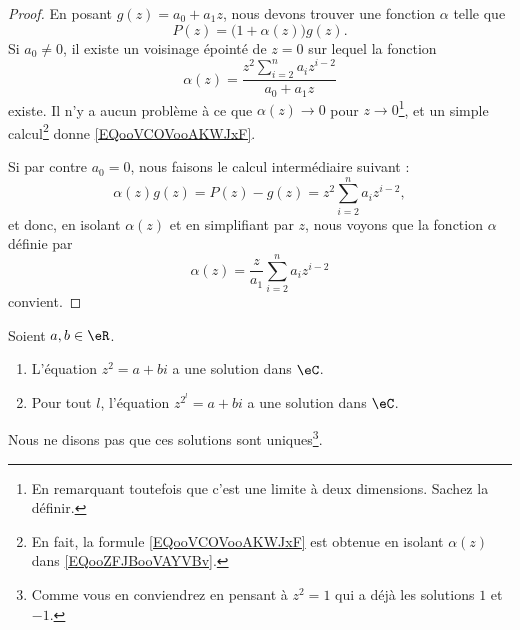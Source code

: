 \begin{proof}
	En posant \( g(z)=a_0+a_1z\), nous devons trouver une fonction \( \alpha\) telle que
	\begin{equation}        \label{EQooZFJBooVAYVBv}
		P(z)=\big( 1+\alpha(z) \big)g(z).
	\end{equation}
	Si \( a_0\neq 0\), il existe un voisinage épointé de \( z=0\) sur lequel la fonction
	\begin{equation}        \label{EQooVCOVooAKWJxF}
		\alpha(z)=\frac{ z^2\sum_{i=2}^na_iz^{i-2} }{ a_0+a_1z }
	\end{equation}
	existe. Il n'y a aucun problème à ce que \( \alpha(z)\to 0\) pour \( z\to 0\)\footnote{En remarquant toutefois que c'est une limite à deux dimensions. Sachez la définir.}, et un simple calcul\footnote{En fait, la formule \eqref{EQooVCOVooAKWJxF} est obtenue en isolant \( \alpha(z)\) dans \eqref{EQooZFJBooVAYVBv}.} donne \eqref{EQooVCOVooAKWJxF}.

	Si par contre \( a_0=0\), nous faisons le calcul intermédiaire suivant :
	\begin{equation}
		\alpha(z)g(z)=P(z)-g(z)=z^2\sum_{i=2}^na_iz^{i-2},
	\end{equation}
	et donc, en isolant \( \alpha(z)\) et en simplifiant par \( z\), nous voyons que la fonction \( \alpha\) définie par
	\begin{equation}
		\alpha(z)=\frac{z}{ a_1 }\sum_{i=2}^na_iz^{i-2}
	\end{equation}
	convient.
\end{proof}

\begin{proposition}       \label{PROPooLBBLooQwEiHr}
	Soient \( a,b\in \eR\).
	\begin{enumerate}
		\item       \label{ITEMooSPSWooKLtqzZ}
		      L'équation \( z^2=a+bi\) a une solution dans \( \eC\).
		\item       \label{ITEMooQOJDooWjfGXv}
		      Pour tout \( l\), l'équation \( z^{2^l}=a+bi\) a une solution dans \( \eC\).
	\end{enumerate}
	Nous ne disons pas que ces solutions sont uniques\footnote{Comme vous en conviendrez en pensant à \( z^2=1\) qui a déjà les solutions \( 1\) et \( -1\).}.
\end{proposition}

